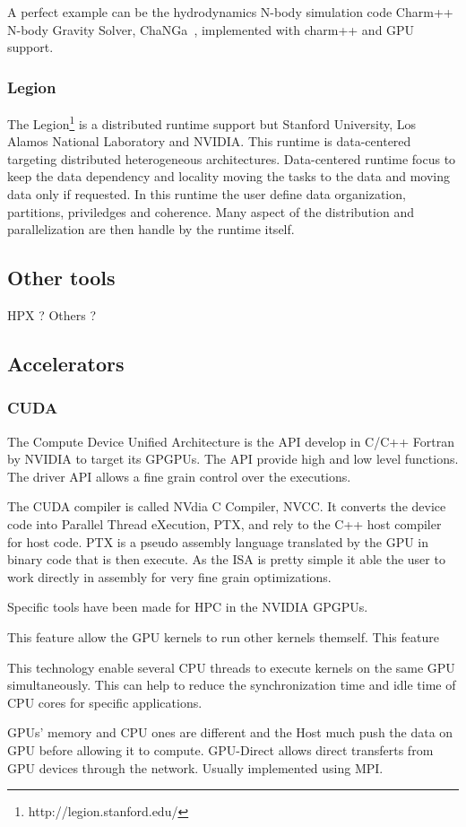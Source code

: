 A perfect example can be the hydrodynamics N-body simulation code Charm++ N-body Gravity Solver, ChaNGa~\cite{jetley2010scaling}, implemented with charm++ and GPU support. 

\subsubsection{Legion}
The Legion\footnote{http://legion.stanford.edu/} is a distributed runtime support but Stanford University, Los Alamos National Laboratory and NVIDIA. 
This runtime is data-centered targeting distributed heterogeneous architectures. 
Data-centered runtime focus to keep the data dependency and locality moving the tasks to the data and moving data only if requested. 
In this runtime the user define data organization, partitions, priviledges and coherence. 
Many aspect of the distribution and parallelization are then handle by the runtime itself.

\subsection{Other tools}
HPX ? 
Others ? 

\subsection{Accelerators}
\subsubsection{CUDA}
The Compute Device Unified Architecture is the API develop in C/C++ Fortran by NVIDIA to target its GPGPUs. 
The API provide high and low level functions. 
The driver API allows a fine grain control over the executions.

The CUDA compiler is called NVdia C Compiler, NVCC. 
It converts the device code into Parallel Thread eXecution, PTX, and rely to the C++ host compiler for host code. 
PTX is a pseudo assembly language translated by the GPU in binary code that is then execute. 
As the ISA is pretty simple it able the user to work directly in assembly for very fine grain optimizations. 

Specific tools have been made for HPC in the NVIDIA GPGPUs. 
\begin{description}
  \item[Dynamic Parallelism] This feature allow the GPU kernels to run other kernels themself. This feature 
  \item[Hyper-Q] This technology enable several CPU threads to execute kernels on the same GPU simultaneously. This can help to reduce the synchronization time and idle time of CPU cores for specific applications.
  \item[NVIDIA GPU-Direct] GPUs' memory and CPU ones are different and the Host much push the data on GPU before allowing it to compute. GPU-Direct allows direct transferts from GPU devices through the network. Usually implemented using MPI.  
\end{description}

